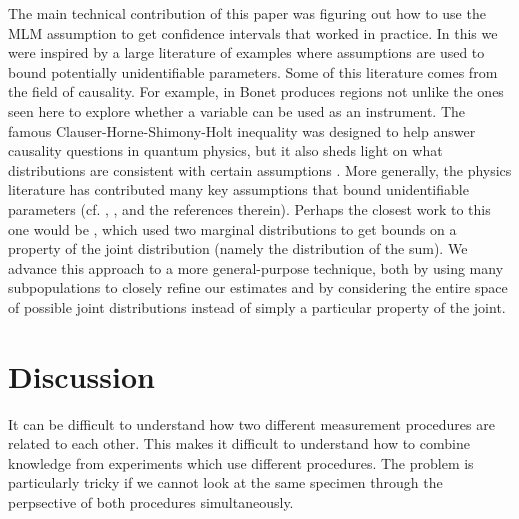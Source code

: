 \begin{itemize}
The main technical contribution of this paper was figuring out how to use the MLM assumption to get confidence intervals that worked in practice.  In this we were inspired by a large literature of examples where assumptions are used to bound potentially unidentifiable parameters.  Some of this literature comes from the field of causality.  For example, in \cite{bonet2001instrumentality} Bonet produces regions not unlike the ones seen here to explore whether a variable can be used as an instrument.  The famous Clauser-Horne-Shimony-Holt inequality was designed to help answer causality questions in quantum physics, but it also sheds light on what distributions are consistent with certain assumptions \cite{clauser1969proposed}.  More generally, the physics literature has contributed many key assumptions that bound unidentifiable parameters (cf. \cite{chaves2014inferring}, \cite{kela2017semidefinite}, and the references therein).  Perhaps the closest work to this one would be \cite{makarov1982estimates}, which used two marginal distributions to get bounds on a property of the joint distribution (namely the distribution of the sum).  We advance this approach to a more general-purpose technique, both by using many subpopulations to closely refine our estimates and by considering the entire space of possible joint distributions instead of simply a particular property of the joint.  

%                                                    


\section{Discussion}

It can be difficult to understand how two different measurement procedures are related to each other.  This makes it difficult to understand how to combine knowledge from experiments which use different procedures.  The problem is particularly tricky if we cannot look at the same specimen through the perpsective of both procedures simultaneously.


\end{itemize}
